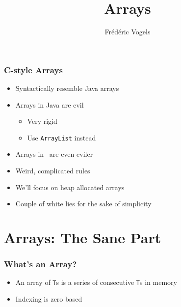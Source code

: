 

\usetikzlibrary{shadows,shapes.multipart}

\title{Arrays}
\author{Fr\'ed\'eric Vogels}




\begin{frame}
  \titlepage
\end{frame}

\begin{frame}
  \frametitle{C-style Arrays}
  \begin{itemize}
    \item Syntactically resemble Java arrays
    \item Arrays in Java are evil
          \begin{itemize}
            \item Very rigid
            \item Use {\tt ArrayList} instead
          \end{itemize}
    \item Arrays in \cpp\ are even eviler
    \item Weird, complicated rules
    \item We'll focus on heap allocated arrays
    \item Couple of white lies for the sake of simplicity
  \end{itemize}
\end{frame}

\section{Arrays: The Sane Part}

\frame{\tableofcontents[currentsection]}

\begin{frame}
  \frametitle{What's an Array?}
  \begin{center}
  \end{center}
  \begin{itemize}
    \item An array of \texttt{T}s is a series of consecutive \texttt{T}s in memory
    \item Indexing is zero based
  \end{itemize}
\end{frame}

